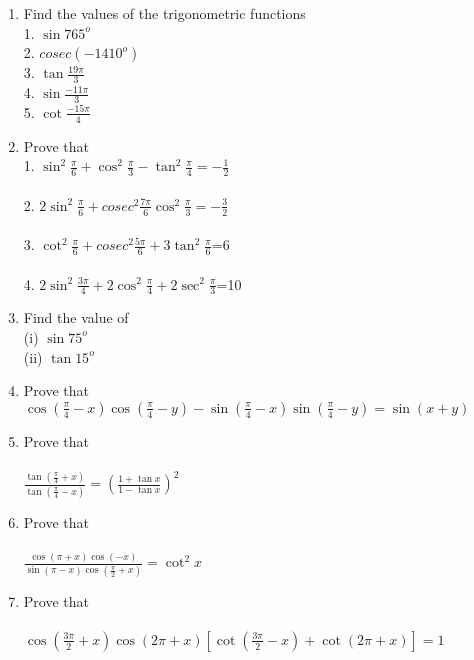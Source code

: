 \begin{enumerate}[label=\arabic*]
\item Find the values of the trigonometric functions\\
1. $\sin765^{o}$\\
2. $cosec(-1410^{o})$\\
3. $\tan\frac{19\pi}{3}$\\
4. $\sin\frac{-11\pi}{3}$\\
5. $\cot\frac{-15\pi}{4}$

\item Prove that
\\1. $\sin^{2}\frac{\pi}{6}+\cos^{2}\frac{\pi}{3}-\tan^{2}\frac{\pi}{4}=-\frac{1}{2}$\\
\\2. $2\sin^{2}\frac{\pi}{6}+cosec^{2}\frac{7\pi}{6}\cos^{2}\frac{\pi}{3}=-\frac{3}{2}$\\
\\3. $\cot^{2}\frac{\pi}{6}+cosec^{2}\frac{5\pi}{6}+3\tan^{2}\frac{\pi}{6}$=6\\
\\4. $2\sin^{2}\frac{3\pi}{4}+2\cos^{2}\frac{\pi}{4}+2\sec^{2}\frac{\pi}{3}$=10\\

\item Find the value of\\
(i) $\sin75^{o}$\\
(ii) $\tan15^{o}$\\

\item Prove that \\
 $\cos(\frac{\pi}{4}-x)\cos(\frac{\pi}{4}-y)-\sin(\frac{\pi}{4}-x)\sin(\frac{\pi}{4}-y)=\sin(x+y)$\\

\item Prove that \\
\\$\frac{\tan(\frac{\pi}{4}+x)}{\tan(\frac{\pi}{4}-x)}=(\frac{1+\tan x}{1-\tan x})^{2}$\\

\item Prove that\\
\\$\frac{\cos(\pi+x)\cos(-x)}{\sin(\pi-x)\cos(\frac{\pi}{2}+x)}=\cot^{2}x$\\

\item Prove that\\
\\$\cos(\frac{3\pi}{2}+x)\cos(2\pi+x)[\cot(\frac{3\pi}{2}-x)+\cot(2\pi +x)]=1$


\end{enumerate}
